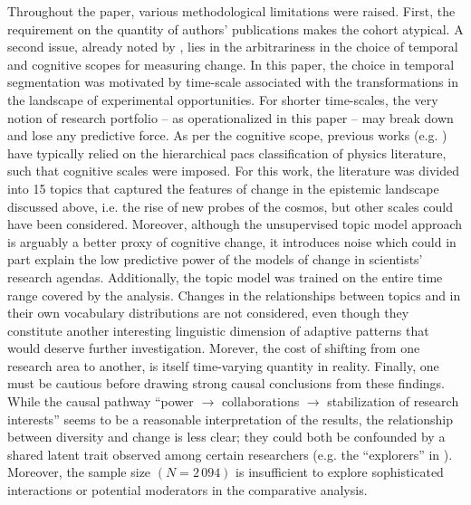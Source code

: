 \documentclass{article}
\begin{document}
Throughout the paper, various methodological limitations were raised. First, the requirement on the quantity of authors' publications makes the cohort atypical. A second issue, already noted by \citet{Gieryn1978}, lies in the arbitrariness in the choice of temporal and cognitive scopes for measuring change. In this paper, the choice in temporal segmentation was motivated by time-scale associated with the transformations in the landscape of experimental opportunities. For shorter time-scales, the very notion of research portfolio -- as operationalized in this paper --  may break down and lose any predictive force. As per the cognitive scope, previous works (e.g. \citealt{Jia2017,Aleta2019,Tripodi2020}) have typically relied on the hierarchical \gls{pacs} classification of physics literature, such that cognitive scales were imposed. For this work, the literature was divided into 15 topics that captured the features of change in the epistemic landscape discussed above, i.e. the rise of new probes of the cosmos, but other scales could have been considered. %
Moreover, although the unsupervised topic model approach is arguably a better proxy of cognitive change, it introduces noise which could in part explain the low predictive power of the models of change in scientists' research agendas. Additionally, the topic model was trained on the entire time range covered by the analysis. Changes in the relationships between topics and in their own vocabulary distributions are not considered, even though they constitute another interesting linguistic dimension of adaptive patterns that would deserve further investigation. Morever, the cost of shifting from one research area to another, is itself time-varying quantity in reality. Finally, one must be cautious before drawing strong causal conclusions from these findings. While the causal pathway ``power $\to$ collaborations $\to$ stabilization of research interests'' seems to be a reasonable interpretation of the results, the relationship between diversity and change is less clear; they could both be confounded by a shared latent trait observed among certain researchers (e.g. the ``explorers'' in \citealt{Chakresh2023}). Moreover, the sample size $(N=2\,094)$ is insufficient to explore sophisticated interactions or potential moderators in the comparative analysis. 
\end{document}
